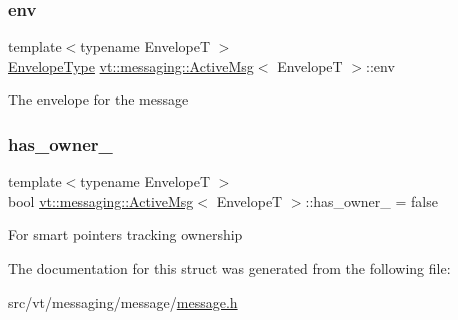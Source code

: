 \subsubsection{\texorpdfstring{env}{env}}
{\footnotesize\ttfamily template$<$typename EnvelopeT $>$ \\
\hyperlink{structvt_1_1messaging_1_1_active_msg_a6e2b0541c25f7290555bf50d7cc05874}{Envelope\+Type} \hyperlink{structvt_1_1messaging_1_1_active_msg}{vt\+::messaging\+::\+Active\+Msg}$<$ EnvelopeT $>$\+::env}

The envelope for the message \mbox{\label{structvt_1_1messaging_1_1_active_msg_a8cdaa2d7bbf2529831a6e7434132d385}} 
\subsubsection{\texorpdfstring{has\+\_\+owner\+\_\+}{has\_owner\_}}
{\footnotesize\ttfamily template$<$typename EnvelopeT $>$ \\
bool \hyperlink{structvt_1_1messaging_1_1_active_msg}{vt\+::messaging\+::\+Active\+Msg}$<$ EnvelopeT $>$\+::has\+\_\+owner\+\_\+ = false}

For smart pointers tracking ownership 

The documentation for this struct was generated from the following file\+:\begin{DoxyCompactItemize}
\item 
src/vt/messaging/message/\hyperlink{message_2message_8h}{message.\+h}\end{DoxyCompactItemize}
